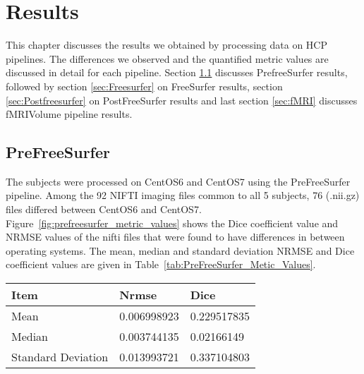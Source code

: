 \chapter{Results}
This chapter discusses the results we obtained by processing data on HCP pipelines. The differences we observed and the quantified metric values are discussed in detail for each pipeline. Section \ref{sec:Prefreesurfer} discusses PrefreeSurfer results, followed by section \ref{sec:Freesurfer} on FreeSurfer results, section \ref{sec:Postfreesurfer} on PostFreeSurfer results and last section \ref{sec:fMRI} discusses fMRIVolume pipeline results.

\section{PreFreeSurfer} \label{sec:Prefreesurfer}
The subjects were processed on CentOS6 and CentOS7 using the PreFreeSurfer pipeline. Among the 92 NIFTI imaging files common to all 5 subjects, 76 (.nii.gz) files differed between CentOS6 and CentOS7. Figure~\ref{fig:prefreesurfer_metric_values} shows the Dice coefficient value and NRMSE values of the nifti files that were found to have differences in between operating systems. The mean, median and standard deviation NRMSE and Dice coefficient values are given in Table~\ref{tab:PreFreeSurfer_Metic_Values}.

\hfill \break
\begin{center}
\begin{tabular}{|l|l|l|}
\hline
\textbf{Item}      & \textbf{Nrmse} & \textbf{Dice} \\ \hline
Mean               & 0.006998923    & 0.229517835   \\ \hline
Median             & 0.003744135    & 0.02166149    \\ \hline
Standard Deviation & 0.013993721    & 0.337104803   \\ \hline
\end{tabular}
\label{tab:PreFreeSurfer_Metic_Values}
\end{center}
\hfill \break


